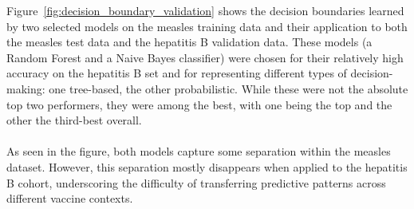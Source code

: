 \documentclass[12pt,a4paper]{report}
\begin{document}
\noindent
Figure~\ref{fig:decision_boundary_validation} shows the decision boundaries learned by two selected models on the measles training data and their application to both the measles test data and the hepatitis B validation data. These models (a Random Forest and a Naive Bayes classifier) were chosen for their relatively high accuracy on the hepatitis B set and for representing different types of decision-making: one tree-based, the other probabilistic. While these were not the absolute top two performers, they were among the best, with one being the top and the other the third-best overall.\\
\\
As seen in the figure, both models capture some separation within the measles dataset. However, this separation mostly disappears when applied to the hepatitis B cohort, underscoring the difficulty of transferring predictive patterns across different vaccine contexts.\\
\end{document}
